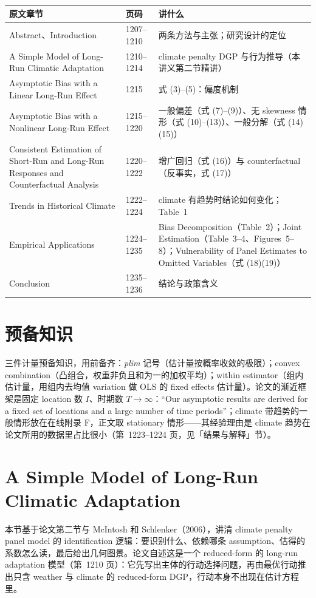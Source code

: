 \begin{table}[htbp]
\centering\small
\begin{tabular}{@{}p{5.4cm}p{1.6cm}p{6.0cm}@{}}
\toprule
原文章节 & 页码 & 讲什么 \\
\midrule
Abstract、Introduction & 1207--1210 & 两条方法与主张；研究设计的定位 \\
A Simple Model of Long-Run Climatic Adaptation & 1210--1214 & climate penalty DGP 与行为推导（本讲义第二节精讲） \\
Asymptotic Bias with a Linear Long-Run Effect & 1215 & 式 (3)--(5)：偏度机制 \\
Asymptotic Bias with a Nonlinear Long-Run Effect & 1215--1220 & 一般偏差（式 (7)--(9)）、无 skewness 情形（式 (10)--(13)）、一般分解（式 (14)(15)） \\
Consistent Estimation of Short-Run and Long-Run Responses and Counterfactual Analysis & 1220--1222 & 增广回归（式 (16)）与 counterfactual（反事实，式 (17)） \\
Trends in Historical Climate & 1222--1224 & climate 有趋势时结论如何变化；Table~1 \\
Empirical Applications & 1224--1235 & Bias Decomposition（Table~2）；Joint Estimation（Table~3--4、Figures~5--8）；Vulnerability of Panel Estimates to Omitted Variables（式 (18)(19)） \\
Conclusion & 1235--1236 & 结论与政策含义 \\
\bottomrule
\end{tabular}
\end{table}

\section{预备知识}

三件计量预备知识，用前备齐：\emph{plim} 记号（估计量按概率收敛的极限）；convex combination（凸组合，权重非负且和为一的加权平均）；within estimator（组内估计量，用组内去均值 variation 做 OLS 的 fixed effects 估计量）。论文的渐近框架是固定 location 数 $I$、时期数 $T\to\infty$：``Our asymptotic results are derived for a fixed set of locations and a large number of time periods''\citep[第~1209 页]{merel2021climate}；climate 带趋势的一般情形放在在线附录 F，正文取 stationary 情形——其经验理由是 climate 趋势在论文所用的数据里占比很小（第~1223--1224 页，见「结果与解释」节）。
\section{A Simple Model of Long-Run Climatic Adaptation}
\label{sec:cca-model}
本节基于论文第二节与 McIntosh 和 Schlenker（2006），讲清 climate penalty panel model 的 identification 逻辑：要识别什么、依赖哪条 assumption、估得的系数怎么读，最后给出几何图景。论文自述这是一个 reduced-form 的 long-run adaptation 模型（第~1210 页）：它先写出主体的行动选择问题，再由最优行动推出只含 weather 与 climate 的 reduced-form DGP，行动本身不出现在估计方程里。

